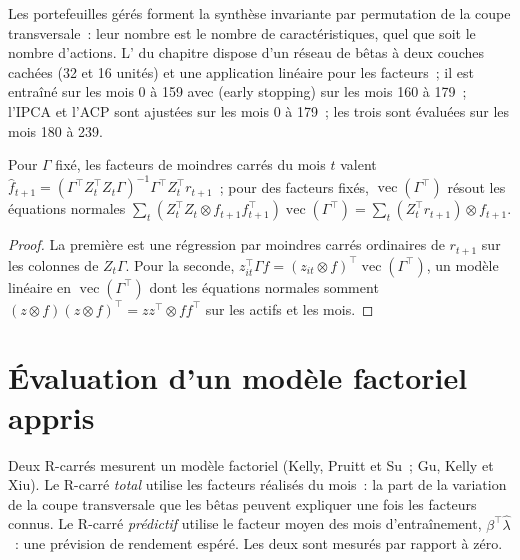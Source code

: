 Les portefeuilles gérés forment la synthèse invariante par permutation de la coupe transversale~: leur nombre est le
nombre de caractéristiques, quel que soit le nombre d'actions. L' du chapitre dispose d'un réseau de bêtas à deux couches cachées (32
et 16 unités) et une application linéaire pour les facteurs~; il est entraîné sur les mois 0 à 159 avec  (early stopping) sur les mois 160 à 179~; l'IPCA
et l'ACP sont ajustées sur les mois 0 à 179~; les trois sont évaluées sur les mois 180 à 239.

\begin{proposition}\label{prop:ml:xsnet:ipca}
Pour $\Gamma$ fixé, les facteurs de moindres carrés du mois $t$ valent $\hat f_{t+1} = (\Gamma^\top Z_t^\top Z_t\Gamma)^{-1}\Gamma^\top
Z_t^\top r_{t+1}$~; pour des facteurs fixés, $\operatorname{vec}(\Gamma^\top)$ résout les équations normales
$\sum_t(Z_t^\top Z_t\otimes f_{t+1}f_{t+1}^\top)\operatorname{vec}(\Gamma^\top) = \sum_t(Z_t^\top r_{t+1})\otimes f_{t+1}$.
\end{proposition}

\begin{proof}
La première est une régression par moindres carrés ordinaires de $r_{t+1}$ sur les colonnes de $Z_t\Gamma$. Pour la seconde, $z_{it}^\top\Gamma f =
(z_{it}\otimes f)^\top\operatorname{vec}(\Gamma^\top)$, un modèle linéaire en $\operatorname{vec}(\Gamma^\top)$ dont les
équations normales somment $(z\otimes f)(z\otimes f)^\top = zz^\top\otimes ff^\top$ sur les actifs et les mois.
\end{proof}

\section{Évaluation d'un modèle factoriel appris}

Deux R-carrés mesurent un modèle factoriel (Kelly, Pruitt et Su~; Gu, Kelly et Xiu). Le R-carré \emph{total} utilise les
facteurs réalisés du mois~: la part de la variation de la coupe transversale que les bêtas peuvent expliquer une fois les facteurs connus.
Le R-carré \emph{prédictif} utilise le facteur moyen des mois d'entraînement, $\beta^\top\hat\lambda$~: une
prévision de rendement espéré. Les deux sont mesurés par rapport à zéro.

